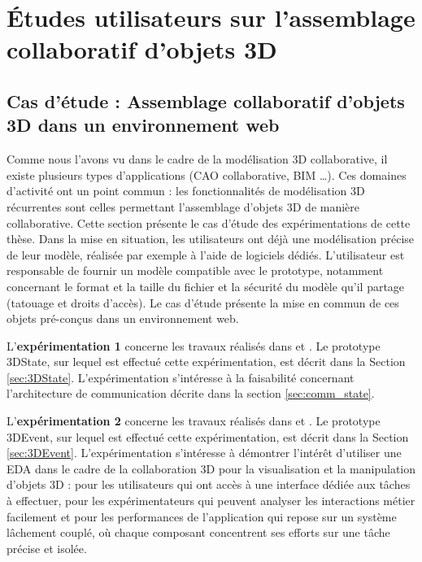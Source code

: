 \chapter{Études utilisateurs sur l'assemblage collaboratif 
d'objets 3D}
\chaptertable

\section{Cas d'étude : Assemblage collaboratif d'objets 3D dans un 
environnement web}
\label{sec:use_case}
Comme nous l'avons vu dans le cadre de la modélisation \gls{3D} collaborative, il 
existe plusieurs types d'applications (\gls{CAO} collaborative, \gls{BIM} \dots). 
Ces domaines d'activité ont un point commun : les fonctionnalités de 
modélisation \gls{3D} récurrentes sont celles permettant l'assemblage d'objets 
\gls{3D} de manière collaborative. Cette section présente le cas d'étude des 
expérimentations de cette thèse. Dans la mise en situation, les utilisateurs ont 
déjà une modélisation précise de leur modèle,  
réalisée par exemple à l'aide de logiciels dédiés. L'utilisateur est responsable de 
fournir un modèle compatible avec le prototype, notamment concernant le format 
et la taille du fichier et la sécurité du modèle qu'il partage (tatouage et droits 
d'accès). Le cas d'étude présente la mise en commun de ces objets pré-conçus 
dans un environnement web.

L'\textbf{expérimentation 1} concerne les travaux réalisés dans 
\cite{Desprat2015a} 
et \cite{Desprat2015b}. Le prototype 3DState, sur lequel est effectué cette 
expérimentation, est décrit dans la Section \ref{sec:3DState}. L'expérimentation 
s'intéresse à la faisabilité concernant l'architecture 
de communication décrite dans la section \ref{sec:comm_state}. 

 
L'\textbf{expérimentation 2} concerne les travaux réalisés dans 
\cite{Desprat2016} et 
\cite{Desprat2017}. Le prototype 3DEvent, sur lequel est effectué cette 
expérimentation, est décrit dans la Section \ref{sec:3DEvent}. L'expérimentation 
s'intéresse à démontrer l'intérêt d'utiliser une \gls{EDA} dans le cadre de la 
collaboration 3D pour la visualisation et la manipulation d'objets \gls{3D} : pour les 
utilisateurs qui ont accès à une interface dédiée aux tâches à effectuer, pour les 
expérimentateurs qui peuvent analyser les interactions métier facilement et pour 
les performances de l'application qui repose sur un système lâchement couplé, 
où chaque composant concentrent ses efforts sur une tâche précise et isolée. 

